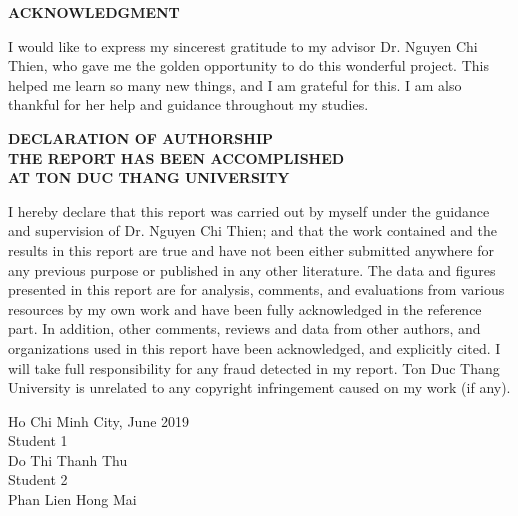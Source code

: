 	
	\newpage
	\thispagestyle{empty}
	\renewcommand{\baselinestretch}{1.2}
	\begin{center}
		\Large{\textbf{ACKNOWLEDGMENT}} \\
	\end{center}
	
I would like to express my sincerest gratitude to my advisor Dr. Nguyen Chi Thien, who gave me the golden opportunity to do this wonderful project. This helped me learn so many new things, and I am grateful for this. I am also thankful for her help and guidance throughout my studies.
	\newpage
	\thispagestyle{empty}
	\renewcommand{\baselinestretch}{1.2}
	
	\begin{center}
		\Large{\textbf{DECLARATION OF AUTHORSHIP}} \\
		\Large{\textbf{THE REPORT HAS BEEN ACCOMPLISHED}} \\
		\Large{\textbf{AT TON DUC THANG UNIVERSITY}} \\
	\end{center}
	
	I hereby declare that this report was carried out by myself under the guidance and supervision of Dr. Nguyen Chi Thien; and that the work contained and the results in this report are true and have not been either submitted anywhere for any previous purpose or published in any other literature. The data and figures presented in this report are for analysis, comments, and evaluations from various resources by my own work and have been fully acknowledged in the reference part.
	In addition, other comments, reviews and data from other authors, and organizations used in this report have been acknowledged, and explicitly cited.
	I will take full responsibility for any fraud detected in my report. Ton Duc Thang University is unrelated to any copyright infringement caused on my work (if any). \\
	
	\begin{flushright}
		Ho Chi Minh City, June 2019 \hspace*{1cm} \\
		Student 1  \hspace*{3cm} \\
		\vspace*{2cm}
		Do Thi Thanh Thu \hspace*{1.83cm} \\
		Student 2  \hspace*{3cm} \\
		\vspace*{2cm}
		Phan Lien Hong Mai \hspace*{1.83cm} \\
	\end{flushright}
